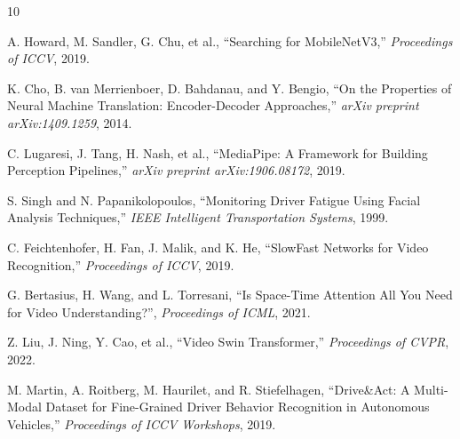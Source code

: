 \documentclass[conference,a4paper]{IEEEtran}
\begin{document}
\begin{thebibliography}{10}
\small

A. Howard, M. Sandler, G. Chu, et al.,
``Searching for MobileNetV3,''
\textit{Proceedings of ICCV}, 2019.

K. Cho, B. van Merrienboer, D. Bahdanau, and Y. Bengio,
``On the Properties of Neural Machine Translation: Encoder-Decoder Approaches,''
\textit{arXiv preprint arXiv:1409.1259}, 2014.

C. Lugaresi, J. Tang, H. Nash, et al.,
``MediaPipe: A Framework for Building Perception Pipelines,''
\textit{arXiv preprint arXiv:1906.08172}, 2019.

S. Singh and N. Papanikolopoulos,
``Monitoring Driver Fatigue Using Facial Analysis Techniques,''
\textit{IEEE Intelligent Transportation Systems}, 1999.

C. Feichtenhofer, H. Fan, J. Malik, and K. He,
``SlowFast Networks for Video Recognition,''
\textit{Proceedings of ICCV}, 2019.

G. Bertasius, H. Wang, and L. Torresani,
``Is Space-Time Attention All You Need for Video Understanding?'',
\textit{Proceedings of ICML}, 2021.

Z. Liu, J. Ning, Y. Cao, et al.,
``Video Swin Transformer,''
\textit{Proceedings of CVPR}, 2022.

M. Martin, A. Roitberg, M. Haurilet, and R. Stiefelhagen,
``Drive\&Act: A Multi-Modal Dataset for Fine-Grained Driver Behavior Recognition in Autonomous Vehicles,''
\textit{Proceedings of ICCV Workshops}, 2019.

\end{thebibliography}
\end{document}

